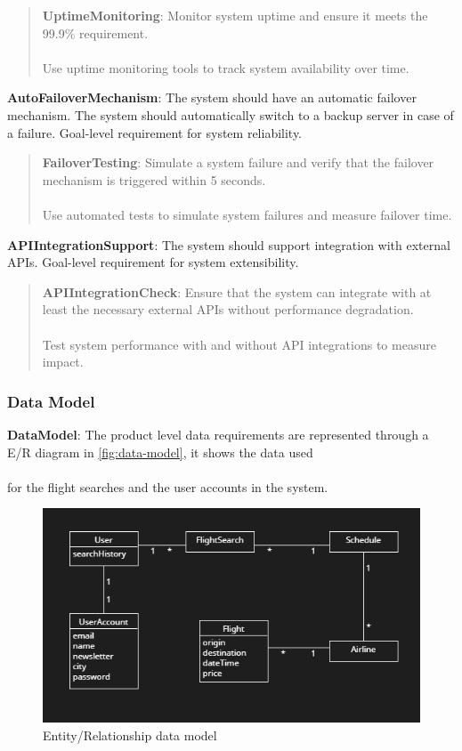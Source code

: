 \begin{quote}
    \textbf{UptimeMonitoring}: Monitor system uptime and ensure it meets the 99.9\% requirement. \\ \\
    Use uptime monitoring tools to track system availability over time.
\end{quote}
\textbf{AutoFailoverMechanism}: The system should have an automatic failover mechanism. The system should automatically switch to a backup server in case of a failure. Goal-level requirement for system reliability.
\begin{quote}
    \textbf{FailoverTesting}: Simulate a system failure and verify that the failover mechanism is triggered within 5 seconds. \\ \\
    Use automated tests to simulate system failures and measure failover time.
\end{quote}
\textbf{APIIntegrationSupport}: The system should support integration with external APIs. Goal-level requirement for system extensibility.
\begin{quote}
    \textbf{APIIntegrationCheck}: Ensure that the system can integrate with at least the necessary external APIs without performance degradation. \\ \\
    Test system performance with and without API integrations to measure impact.
\end{quote}

\subsubsection{Data Model}
\textbf{DataModel}: The product level data requirements are represented through a E/R diagram in \autoref{fig:data-model}, it shows the data used \\ \\
for the flight searches and the user accounts in the system.

\begin{figure}[H]
    \includegraphics[width=1\textwidth]{resources/dataRelations.PNG}
    \caption{Entity/Relationship data model}
    \label{fig:data-model}
\end{figure}

